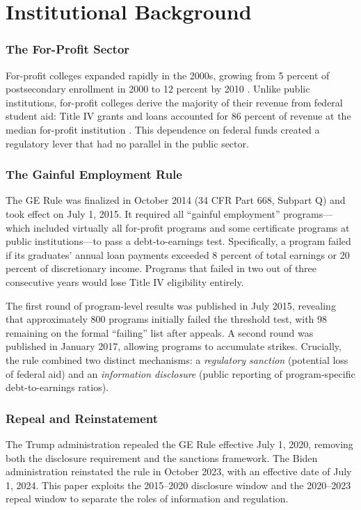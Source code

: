 \documentclass[12pt]{article}
\begin{document}
\section{Institutional Background}

\subsubsection*{The For-Profit Sector} For-profit colleges expanded rapidly in the 2000s, growing from 5 percent of postsecondary enrollment in 2000 to 12 percent by 2010 \citep{deming_goldin_katz2012}. Unlike public institutions, for-profit colleges derive the majority of their revenue from federal student aid: Title IV grants and loans accounted for 86 percent of revenue at the median for-profit institution \citep{kelchen2017}. This dependence on federal funds created a regulatory lever that had no parallel in the public sector.

\subsubsection*{The Gainful Employment Rule} The GE Rule was finalized in October 2014 (34 CFR Part 668, Subpart Q) and took effect on July 1, 2015. It required all ``gainful employment'' programs---which included virtually all for-profit programs and some certificate programs at public institutions---to pass a debt-to-earnings test. Specifically, a program failed if its graduates' annual loan payments exceeded 8 percent of total earnings or 20 percent of discretionary income. Programs that failed in two out of three consecutive years would lose Title IV eligibility entirely.

The first round of program-level results was published in July 2015, revealing that approximately 800 programs initially failed the threshold test, with 98 remaining on the formal ``failing'' list after appeals. A second round was published in January 2017, allowing programs to accumulate strikes. Crucially, the rule combined two distinct mechanisms: a \textit{regulatory sanction} (potential loss of federal aid) and an \textit{information disclosure} (public reporting of program-specific debt-to-earnings ratios).

\subsubsection*{Repeal and Reinstatement} The Trump administration repealed the GE Rule effective July 1, 2020, removing both the disclosure requirement and the sanctions framework. The Biden administration reinstated the rule in October 2023, with an effective date of July 1, 2024. This paper exploits the 2015--2020 disclosure window and the 2020--2023 repeal window to separate the roles of information and regulation.
\end{document}
